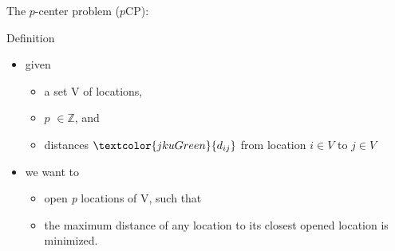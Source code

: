 \documentclass[utf8,aspectratio=1610,ngerman,english]{beamer}
\renewcommand{\emph}[1]{\textcolor{jkuGreen}{#1}}
\newcommand{\pCP}{($p$CP)\xspace}
\newcommand{\npCP}{(n-$p$CP)\xspace}
\begin{document}
\begin{frame}{The $p$-center problem \pCP:}
    \begin{block}{Definition}
        \begin{itemize}\pause
            \item given
                  \begin{itemize}
                      \item a set V of locations, \pause
                      \item \emph{$p$} $\in \mathbb{Z}$, and \pause
                      \item \emph{distances} $\emph{d_{ij}}$ from location $i \in V$ to $j \in V$ \pause
                  \end{itemize}
            \item we want to
                  \begin{itemize}
                      \item \emph{open \textit{p} locations} of V, such that \pause
                      \item the \emph{maximum distance} of any location to its closest opened location is \emph{minimized}.
                  \end{itemize}
        \end{itemize}
    \end{block}
\end{frame}
\end{document}
